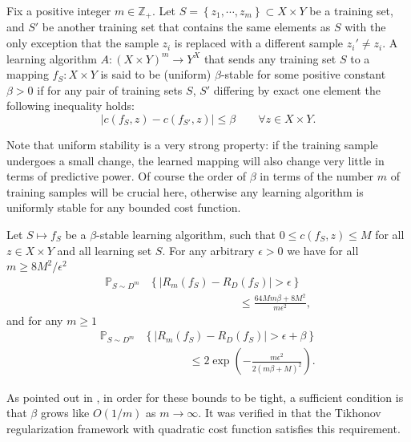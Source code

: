 \documentclass[letterpaper]{article} %
\begin{document}
\begin{definition}
  \label{defn:uniform-stability}
  Fix a positive integer $m\in\mathbb{Z}_+$. Let $S=\left\{ z_1,\cdots,z_m \right\}\subset X\times Y$ be a training set, and $S'$ be another training set that contains the same elements as $S$ with the only exception that the sample $z_i$ is replaced with a different sample $z_i'\neq z_i$. A learning algorithm $A:\left( X\times Y \right)^m\rightarrow Y^X$ that sends any training set $S$ to a mapping $f_S:X\times Y$ is said to be (uniform) $\beta$-stable for some positive constant $\beta>0$ if for any pair of training sets $S$, $S'$ differing by exact one element the following inequality holds:
  \begin{equation*}
    \left| c \left( f_S,z \right)-c\left(f_{S'},z\right) \right|\leq \beta\qquad\forall z\in X\times Y.
  \end{equation*}
\end{definition}
Note that uniform stability is a very strong property: if the training sample undergoes a small change, the learned mapping will also change very little in terms of predictive power. Of course the order of $\beta$ in terms of the number $m$ of training samples will be crucial here, otherwise any learning algorithm is uniformly stable for any bounded cost function.

\begin{theorem}
  \label{thm:bousquet-elisseeff}
  Let $S\mapsto f_S$ be a $\beta$-stable learning algorithm, such that $0\leq c \left( f_S,z \right)\leq M$ for all $z\in X\times Y$ and all learning set $S$. For any arbitrary $\epsilon>0$ we have for all $m\geq 8M^2/\epsilon^2$
  \begin{equation}
    \label{eq:fraction-bounds}
    \begin{aligned}
    \mathbb{P}_{S\sim D^m} &\left\{ \left| R_m \left( f_S \right)-R_D \left( f_S \right) \right| > \epsilon\right\}\\
    &\qquad\qquad\qquad\qquad\leq \frac{64 Mm\beta+8M^2}{m\epsilon^2},
    \end{aligned}
  \end{equation}
  and for any $m\geq 1$
  \begin{equation}
    \label{eq:exponential-bounds}
    \begin{aligned}
    \mathbb{P}_{S\sim D^m}&\left\{ \left| R_m \left( f_S \right)-R_D \left( f_S \right) \right| > \epsilon+\beta\right\}\\
    &\qquad\qquad\leq 2\exp \left( -\frac{m\epsilon^2}{2 \left( m\beta+M \right)^2} \right).
    \end{aligned}
  \end{equation}
\end{theorem}
As pointed out in \cite{Algorithmic_Stability}, in order for these bounds to be tight, a sufficient condition is that $\beta$ grows like $O \left( 1/m \right)$ as $m\rightarrow\infty$. It was verified in \cite{Algorithmic_Stability} that the Tikhonov regularization framework with quadratic cost function satisfies this requirement.
\end{document}
